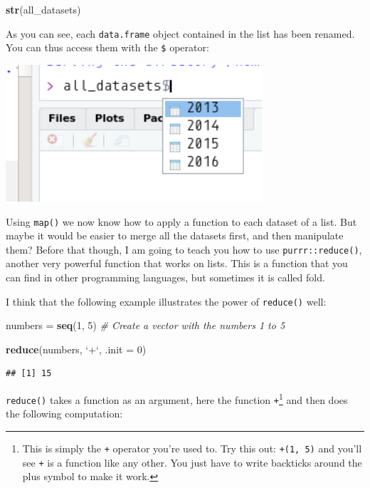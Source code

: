 \documentclass[]{gitbook}
\newenvironment{Shaded}{\begin{snugshade}}{\end{snugshade}}
\newcommand{\CommentTok}[1]{\textcolor[rgb]{0.56,0.35,0.01}{\textit{#1}}}
\newcommand{\DataTypeTok}[1]{\textcolor[rgb]{0.13,0.29,0.53}{#1}}
\newcommand{\DecValTok}[1]{\textcolor[rgb]{0.00,0.00,0.81}{#1}}
\newcommand{\KeywordTok}[1]{\textcolor[rgb]{0.13,0.29,0.53}{\textbf{#1}}}
\newcommand{\NormalTok}[1]{#1}
\newcommand{\StringTok}[1]{\textcolor[rgb]{0.31,0.60,0.02}{#1}}
\let\rmarkdownfootnote\footnote%
\def\footnote{\protect\rmarkdownfootnote}
\begin{document}
\begin{Shaded}
\begin{Highlighting}[]
\KeywordTok{str}\NormalTok{(all_datasets)}
\end{Highlighting}
\end{Shaded}

As you can see, each \texttt{data.frame} object contained in the list has been renamed. You can thus
access them with the \texttt{\$} operator:

\includegraphics[width=3.75in]{pics/all_datasets_names}

Using \texttt{map()} we now know how to apply a function to each dataset of a list. But maybe it would be
easier to merge all the datasets first, and then manipulate them? Before that though, I am going to
teach you how to use \texttt{purrr::reduce()}, another very powerful function that works on lists. This is
a function that you can find in other programming languages, but sometimes it is called fold.

I think that the following example illustrates the power of \texttt{reduce()} well:

\begin{Shaded}
\begin{Highlighting}[]
\NormalTok{numbers =}\StringTok{ }\KeywordTok{seq}\NormalTok{(}\DecValTok{1}\NormalTok{, }\DecValTok{5}\NormalTok{) }\CommentTok{# Create a vector with the numbers 1 to 5}

\KeywordTok{reduce}\NormalTok{(numbers, }\StringTok{`}\DataTypeTok{+}\StringTok{`}\NormalTok{, }\DataTypeTok{.init =} \DecValTok{0}\NormalTok{)}
\end{Highlighting}
\end{Shaded}

\begin{verbatim}
## [1] 15
\end{verbatim}

\texttt{reduce()} takes a function as an argument, here the function \texttt{+}\footnote{This is simply the \texttt{+} operator
  you're used to. Try this out: \texttt{\textasciigrave{}+\textasciigrave{}(1,\ 5)} and you'll see \texttt{+} is a function like any other. You
  just have to write backticks around the plus symbol to make it work.} and then does the following
computation:
\end{document}
